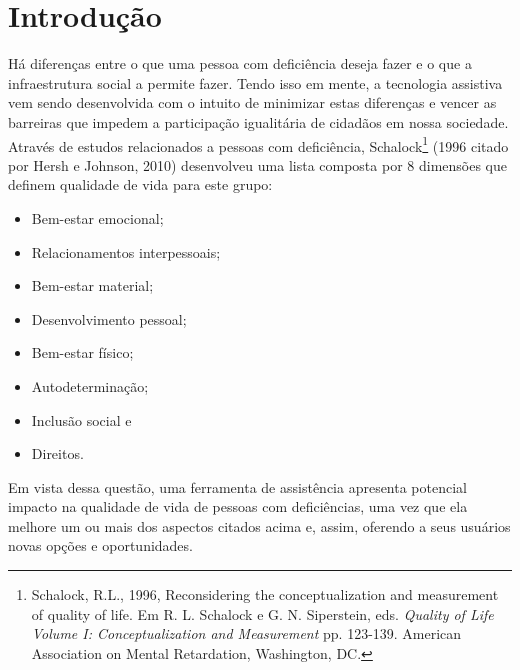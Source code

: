 \chapter{\label{chap:intro}Introdução}


Há diferenças entre o que uma pessoa com deficiência deseja fazer e o que a infraestrutura social a permite fazer. Tendo isso em mente, a tecnologia assistiva vem sendo desenvolvida com o intuito de minimizar estas diferenças e vencer as barreiras que impedem a participação igualitária de cidadãos em nossa sociedade. Através de estudos relacionados a pessoas com deficiência, Schalock\footnote{Schalock, R.L., 1996, Reconsidering the conceptualization and measurement of quality of life. Em R. L. Schalock e G. N. Siperstein, eds. \emph{Quality of Life Volume I: Conceptualization and Measurement} pp. 123-139. American Association on Mental Retardation, Washington, DC.} (1996 citado por Hersh e Johnson, 2010)\nocite{HERSH2010ASSISTIVE} desenvolveu uma lista composta por 8 dimensões que definem qualidade de vida para este grupo:
\begin{itemize}
    \item Bem-estar emocional;
    \item Relacionamentos interpessoais;
    \item Bem-estar material;
    \item Desenvolvimento pessoal;
    \item Bem-estar físico;
    \item Autodeterminação;
    \item Inclusão social e
    \item Direitos.
\end{itemize}
Em vista dessa questão, uma ferramenta de assistência apresenta potencial impacto na qualidade de vida de pessoas com deficiências, uma vez que ela melhore um ou mais dos aspectos citados acima e, assim, oferendo a seus usuários novas opções e oportunidades.

